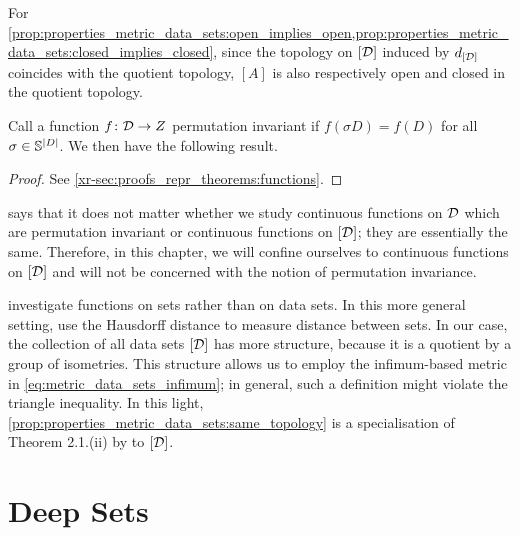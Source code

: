 \documentclass[12pt, twoside]{report}
\newcommand{\xrprefix}[1]{xr-#1}
\begin{document}
For \cref{prop:properties_metric_data_sets:open_implies_open,prop:properties_metric_data_sets:closed_implies_closed},
since the topology on $[\mathcal{D}]$ induced by $d_{[\mathcal{D}]}$ coincides with the quotient topology, $[A]$ is also respectively open and closed in the quotient topology.

Call a function $f\colon\mathcal{D}  \to Z$ permutation invariant if $f(\sigma D) = f(D)$ for all $\sigma \in \mathbb{S}^{\lvert D\rvert}$.
We then have the following result.

\begin{proof}
    See \cref{\xrprefix{sec:proofs_repr_theorems:functions}}.
\end{proof}

 says that it does not matter whether we study continuous functions on $\mathcal{D}$ which are permutation invariant or continuous functions on $[\mathcal{D}]$;
they are essentially the same.
Therefore, in this chapter, we will confine ourselves to continuous functions on $[\mathcal{D}]$ and will not be concerned with the notion of permutation invariance.

\Textcite{Qi:2017:PointNet_Deep_Learning_on_Point} investigate functions on sets rather than on data sets.
In this more general setting, \citeauthor{Qi:2017:PointNet_Deep_Learning_on_Point} use the Hausdorff distance to measure distance between sets.
In our case, the collection of all data sets $[\mathcal{D}]$ has more structure, because it is a quotient by a group of isometries.
This structure allows us to employ the infimum-based metric in \eqref{eq:metric_data_sets_infimum};
in general, such a definition might violate the triangle inequality.
In this light, \cref{prop:properties_metric_data_sets:same_topology} is a specialisation of Theorem 2.1.(ii) by \textcite{Cagliari:2015:The_Natural_Pseudo-Distance_as_A} to $[\mathcal{D}]$.

\section{Deep Sets}
\label{sec:repr_theorems:deep_sets}
\end{document}
